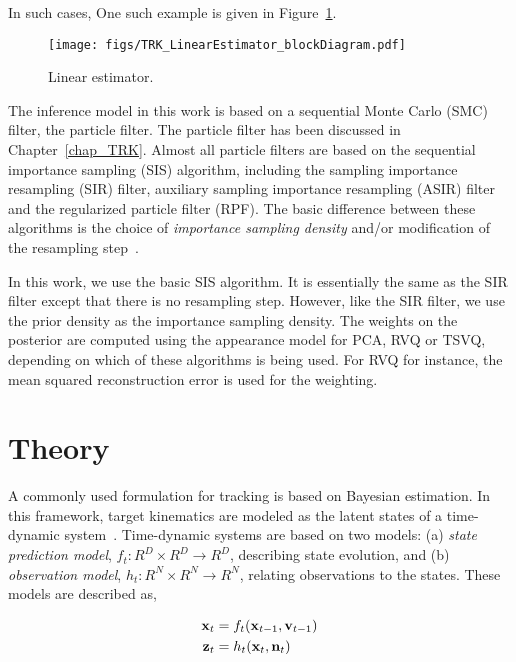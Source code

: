In such cases, One such example is given in Figure~\ref{TRK_overviewDiagram}.  

								\begin{figure}[t]
								\center
								\texttt{[image: figs/TRK\_LinearEstimator\_blockDiagram.pdf]}
								\caption{Linear estimator.}
								\label{TRK_overviewDiagram}
								\end{figure}


The inference model in this work is based on a sequential Monte Carlo (SMC) filter, the particle filter.  The particle filter has been discussed in Chapter~\ref{chap_TRK}.  Almost all particle filters are based on the sequential importance sampling (SIS) algorithm, including the sampling importance resampling (SIR) filter, auxiliary sampling importance resampling (ASIR) filter and the regularized particle filter (RPF).  The basic difference between these algorithms is the choice of \emph{importance sampling density} and/or modification of the resampling step~\cite{2002_JNL_PF_Arulampalam}.  

In this work, we use the basic SIS algorithm.  It is essentially the same as the SIR filter except that there is no resampling step.  However, like the SIR filter, we use the prior density as the importance sampling density.  The weights on the posterior are computed using the appearance model for PCA, RVQ or TSVQ, depending on which of these algorithms is being used.  For RVQ for instance, the mean squared reconstruction error is used for the weighting.

\section{Theory}




A commonly used formulation for tracking is based on Bayesian estimation.  In this framework, target kinematics are modeled as the latent states of a time-dynamic system~\cite{2002_JNL_PF_Arulampalam}.  Time-dynamic systems are based on two models: (a) \emph{state prediction model}, ${f_t:R^D \times R^D \rightarrow R^D}$, describing state evolution, and (b) \emph{observation model}, ${h_t:R^N \times R^N \rightarrow R^N}$, relating observations to the states.  These models are described as,

\begin{align}
\mathbf{x}_t &= f_t(\mathbf{x}_{t-1}, \mathbf{v}_{t-1}) \notag\\
\mathbf{z}_t &= h_t(\mathbf{x}_t, \mathbf{n}_t)
\label{Eq:TDS}
\end{align}

